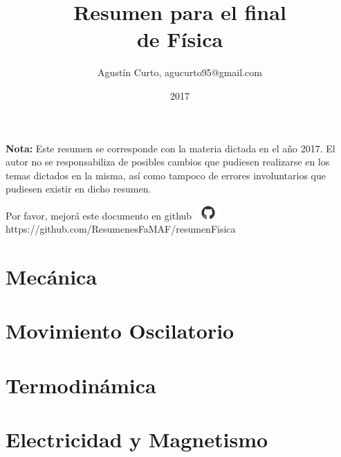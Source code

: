 \documentclass[12pt,a4paper]{article}
\author{Agustín Curto, agucurto95@gmail.com}
\title{Resumen para el final \\ de Física}
\date{2017}
\newcommand{\PN}{\par\noindent}
\begin{document}
	\clearpage\maketitle
	\thispagestyle{empty}
	\tableofcontents

	\vspace{5cm}
	\PN \textbf{Nota:} Este resumen se corresponde con la materia dictada en el año 2017. El autor no se responsabiliza de
	posibles cambios que pudiesen realizarse en los temas dictados en la misma, así como tampoco de errores involuntarios
	que pudiesen existir en dicho resumen.

	\vspace{\fill}
	\begin{center}
		Por favor, mejorá este documento en github
		\includegraphics[width=1cm]{graphics/github.png} \\
		https://github.com/ResumenesFaMAF/resumenFisica
	\end{center}

	\pagebreak

	\part{Mecánica}
		
		
		
		
		
		
		
		
		
		
		
		
		

	\part{Movimiento Oscilatorio}
		
		
		
		
		

	\part{Termodinámica}
		
		
		
		
		
		
		
		
		

	\part{Electricidad y Magnetismo}
		
		
		
		
		
		
\end{document}
